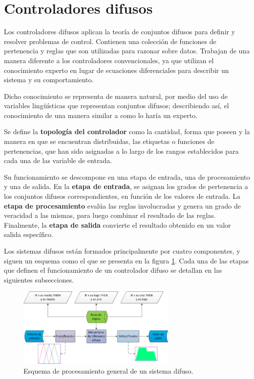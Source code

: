 
\section{Controladores difusos} 
\label{sec:contrdi}


Los controladores difusos aplican la teoría de conjuntos difusos para definir y resolver problemas de control. Contienen una colección de funciones de pertenencia y reglas que son utilizadas para razonar sobre datos. Trabajan de una manera diferente a los controladores convencionales, ya que utilizan el conocimiento experto en lugar de ecuaciones diferenciales para describir un sistema y su comportamiento. 

Dicho conocimiento se representa de manera natural,  por medio del uso de variables lingüísticas que representan conjuntos difusos; describiendo así, el conocimiento de una manera similar a como lo haría un experto. 

Se define la \textbf{topología del controlador} como la cantidad, forma que poseen y la manera en que se encuentran distribuidas, las etiquetas o funciones de pertenencias, que han sido asignadas a lo largo de los rangos establecidos para cada una de las variable de entrada.

Su funcionamiento se descompone en una etapa de entrada, una de procesamiento y una de salida. En la \textbf{etapa de entrada}, se asignan los grados de pertenencia a los conjuntos difusos correspondientes, en función de los valores de entrada. La \textbf{etapa de procesamiento} evalúa las reglas involucradas y genera un grado de veracidad a las mismas, para luego combinar el resultado de las reglas. Finalmente, la \textbf{etapa de salida} convierte el resultado obtenido en un valor salida específico. 

Los sistemas difusos están formados principalmente por cuatro componentes, y siguen un esquema como el que se presenta en la figura \ref{fig:controlador}. 
Cada una de las etapas que definen el funcionamiento de un controlador difuso se detallan en las siguientes subsecciones.


\begin{figure}[htb]
\centering
\includegraphics[width=0.7\textwidth,type=png,ext=.png,read=.png]{figures/sistemad}
\caption{Esquema de procesamiento general de un sistema difuso.}
\label{fig:controlador}
\end{figure} 



